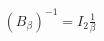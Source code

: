 \documentclass[preview]{standalone}
\begin{document}
\begin{align*}
(B_{\beta})^{-1} =   \mathit{I}_2 \frac{1}{\beta}
\end{align*}
\end{document}
